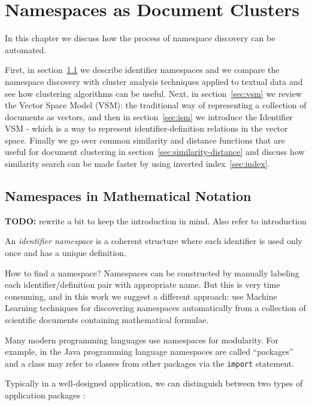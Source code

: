 \section{Namespaces as Document Clusters} \label{sec:namespaces-top}


In this chapter we discuss how the process of namespace discovery
can be automated.

First, in section~\ref{sec:namespaces} we describe identifier namespaces and
we compare the namespace discovery with cluster analysis techniques
applied to textual data and see how clustering algorithms can be
useful. Next, in section~\ref{sec:vsm}
we review the Vector Space Model (VSM): the traditional way of
representing a collection of documents as vectors, and then in
section~\ref{sec:ism} we introduce the Identifier VSM - which
is a way to represent identifier-definition relations in the
vector space. Finally we go over common similarity and distance
functions that are useful for document clustering in
section~\ref{sec:similarity-distance} and discuss how similarity
search can be made faster by using inverted index~\ref{sec:index}.



\subsection{Namespaces in Mathematical Notation} \label{sec:namespaces}

\textbf{TODO:} rewrite a bit to keep the introduction in mind. Also refer to introduction

An \emph{identifier namespace} is a coherent structure where
each identifier is used only once and has a unique definition.

How to find a namespace? Namespaces can be constructed by
manually labeling each identifier/definition pair with appropriate
name. But this is very time consuming, and in this work we suggest
a different approach: use Machine Learning techniques for
discovering namespaces automatically from a collection of scientific
documents containing mathematical formulae.


Many modern programming languages use namespaces for modularity.
For example, in the Java programming language \cite{gosling2014java}
namespaces are called ``packages'' and
a class may refer to classes from other packages via the \texttt{import}
statement.



Typically in a well-designed application, we can distinguish between
two types of application packages \cite{evans2004domain}:

